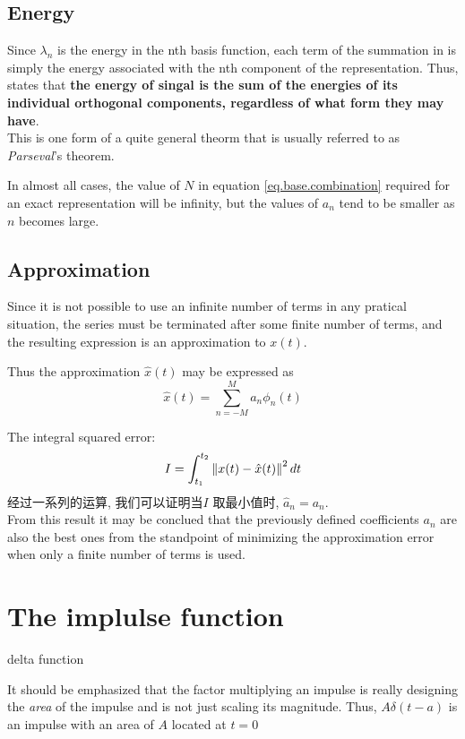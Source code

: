 \documentclass{article}
\begin{document}
\subsection{Energy}
Since $\lambda_n$ is the energy in the nth basis function, 
each term of the summation in \lasteq is simply the energy associated with the nth component of the representation. 
Thus, \lasteq states that \textbf{the energy of singal is the sum of the energies of its individual orthogonal components, regardless of what form they may have}. \\
This is one form of a quite general theorm that is usually referred to as \textit{Parseval}'s theorem.

In almost all cases, the value of $N$ in equation \eqref{eq.base.combination} required for an exact representation will be infinity,
but the values of $a_n$ tend to be smaller as $n$ becomes large. 

\subsection{Approximation}
Since it is not possible to use an infinite number of terms in any pratical situation, 
the series must be terminated after some finite number of terms, and the resulting expression is an approximation to $x(t)$. 

Thus the approximation $\hat{x}(t)$ may be expressed as
\begin{equation}
\hat{x}(t) = \sum_{n = -M}^M a_n \phi_n(t)
\end{equation}

The integral squared error:
$$
I = \int_{t_1}^{t_2} \left\Vert x(t) - \hat{x}(t)\right\Vert^2 dt
$$
经过一系列的运算, 我们可以证明当$I$ 取最小值时, $\hat{a}_n = a_n$.\\
From this result it may be conclued that the previously defined coefficients $a_n$ are also the best ones from the standpoint of minimizing the approximation error when only a finite number of terms is used.

\section{The implulse function}
delta function

It should be emphasized that the factor multiplying an impulse is really designing the \textit{area} of the impulse and is not just scaling its magnitude.
Thus, $A\delta(t-a)$ is an impulse with an area of $A$ located at $t=0$
\end{document}
